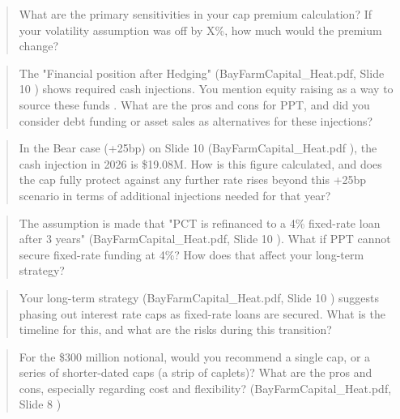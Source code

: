 \documentclass[11pt, a4paper, british]{article}
\begin{document}
\begin{quote}
    What are the primary sensitivities in your cap premium calculation? If your volatility assumption was off by X\%, how much would the premium change?
\end{quote}

\newpage

\begin{quote}
    The "Financial position after Hedging" (BayFarmCapital_Heat.pdf, Slide 10 ) shows required cash injections. You mention equity raising as a way to source these funds . What are the pros and cons for PPT, and did you consider debt funding or asset sales as alternatives for these injections?
\end{quote}

\newpage

\begin{quote}
    In the Bear case (+25bp) on Slide 10 (BayFarmCapital_Heat.pdf ), the cash injection in 2026 is \$19.08M. How is this figure calculated, and does the cap fully protect against any further rate rises beyond this +25bp scenario in terms of additional injections needed for that year?
\end{quote}

\newpage

\begin{quote}
    The assumption is made that "PCT is refinanced to a 4\% fixed-rate loan after 3 years" (BayFarmCapital_Heat.pdf, Slide 10 ). What if PPT cannot secure fixed-rate funding at 4\%? How does that affect your long-term strategy?
\end{quote}

\newpage

\begin{quote}
    Your long-term strategy (BayFarmCapital_Heat.pdf, Slide 10 ) suggests phasing out interest rate caps as fixed-rate loans are secured. What is the timeline for this, and what are the risks during this transition?
\end{quote}

\newpage

\begin{quote}
    For the \$300 million notional, would you recommend a single cap, or a series of shorter-dated caps (a strip of caplets)? What are the pros and cons, especially regarding cost and flexibility? (BayFarmCapital_Heat.pdf, Slide 8 )
\end{quote}

\newpage
\end{document}
